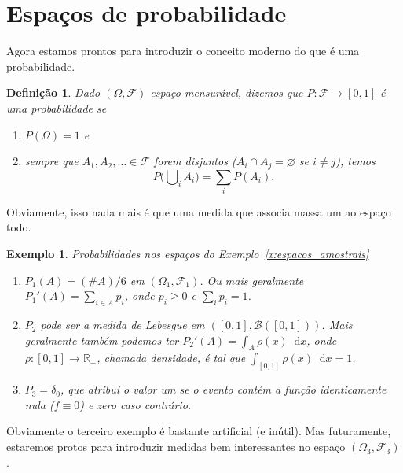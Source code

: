 \documentclass[reqno, final]{book}
\newcommand*\1{\mathds{1}}
\newtheorem{definition}[theorem]{Definição}
\newtheorem{example}{Exemplo}[section]
\renewcommand*\d{\mathop{}\!\mathrm{d}}
\DeclareMathOperator*{\mcup}{{\textstyle \bigcup}}
\begin{document}
\section{Espaços de probabilidade}

Agora estamos prontos para introduzir o conceito moderno do que é uma probabilidade.

\begin{definition}
  Dado $(\Omega, \mathcal{F})$ espaço mensurável, dizemos que $P:\mathcal{F} \to [0,1]$ é uma \emph{probabilidade}  se
  \begin{enumerate}[\quad a)]
  \item $P(\Omega) = 1$ e
  \item sempre que $A_1, A_2, \dots \in \mathcal{F}$ forem disjuntos ($A_i \cap A_j = \varnothing$ se $i \neq j$), temos
    \begin{equation}
      P\big({\mcup\nolimits_i} A_i\big) = \sum_i P(A_i).
    \end{equation}
  \end{enumerate}
\end{definition}

Obviamente, isso nada mais é que uma medida que associa massa um ao espaço todo.

\begin{example} Probabilidades nos espaços do Exemplo~\ref{x:espacos_amostrais}
  \begin{enumerate}[\quad a)]
  \item $P_1(A) = (\#A)/6$ em $(\Omega_1, \mathcal{F}_1)$.
    Ou mais geralmente $P_1'(A) = \sum_{i \in A} p_i$, onde $p_i \geq 0$ e $\sum_i p_i = 1$.
  \item $P_2$ pode ser a medida de Lebesgue em $([0,1], \mathcal{B}([0,1]))$.
    Mais geralmente também podemos ter $P_2'(A) = \int_A \rho(x) \d x$, onde $\rho:[0,1] \to \mathbb{R}_+$, chamada densidade, é tal que $\int_{[0,1]} \rho (x) \d x = 1$.
  \item $P_3 = \delta_{0}$, que atribui o valor um se o evento contém a função identicamente nula ($f \equiv 0$) e zero caso contrário.
  \end{enumerate}
\end{example}
Obviamente o terceiro exemplo é bastante artificial (e inútil).
Mas futuramente, estaremos protos para introduzir medidas bem interessantes no espaço $(\Omega_3, \mathcal{F}_3)$.
\end{document}
